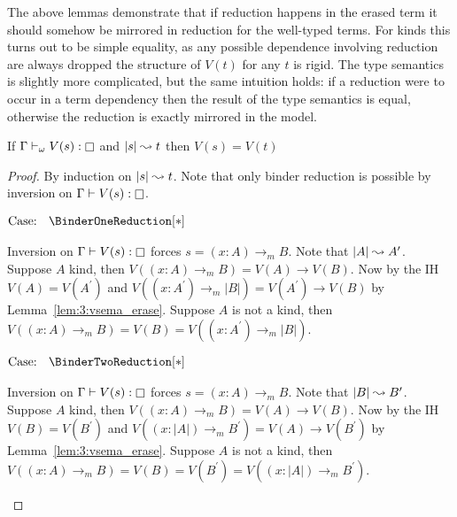 The above lemmas demonstrate that if reduction happens in the erased term it should somehow be mirrored in reduction for the well-typed terms.
For kinds this turns out to be simple equality, as any possible dependence involving reduction are always dropped the structure of $V(t)$ for any $t$ is rigid.
The type semantics is slightly more complicated, but the same intuition holds: if a reduction were to occur in a term dependency then the result of the type semantics is equal, otherwise the reduction is exactly mirrored in the model.

\begin{lemma}
    \label{lem:3:vsema_erase_red_step}
    If $\Gamma \vdash_\omega V(s) : \kind$ and $|s| \leadsto t$ then $V(s) = V(t)$
\end{lemma}
\begin{proof}
    By induction on $|s| \leadsto t$.
    Note that only binder reduction is possible by inversion on $\Gamma \vdash V(s) : \kind$.

    $\text{Case: }\begin{array}{c} \BinderOneReduction[*] \end{array}$
    \begin{proofcase}
        Inversion on $\Gamma \vdash V(s) : \kind$ forces $s = (x : A) \to_m B$.
        Note that $|A| \leadsto A^\prime$.
        Suppose $A$ kind, then $V((x : A) \to_m B) = V(A) \to V(B)$.
        Now by the IH $V(A) = V(A^\prime)$ and $V((x : A^\prime) \to_m |B|) = V(A^\prime) \to V(B)$ by Lemma~\ref{lem:3:vsema_erase}.
        Suppose $A$ is not a kind, then $V((x : A) \to_m B) = V(B) = V((x : A^\prime) \to_m |B|)$.
    \end{proofcase}

    $\text{Case: }\begin{array}{c} \BinderTwoReduction[*] \end{array}$
    \begin{proofcase}
        Inversion on $\Gamma \vdash V(s) : \kind$ forces $s = (x : A) \to_m B$.
        Note that $|B| \leadsto B^\prime$.
        Suppose $A$ kind, then $V((x : A) \to_m B) = V(A) \to V(B)$.
        Now by the IH $V(B) = V(B^\prime)$ and $V((x : |A|) \to_m B^\prime) = V(A) \to V(B^\prime)$ by Lemma~\ref{lem:3:vsema_erase}.
        Suppose $A$ is not a kind, then $V((x : A) \to_m B) = V(B) = V(B^\prime) = V((x : |A|) \to_m B^\prime)$.
    \end{proofcase}
\end{proof}


